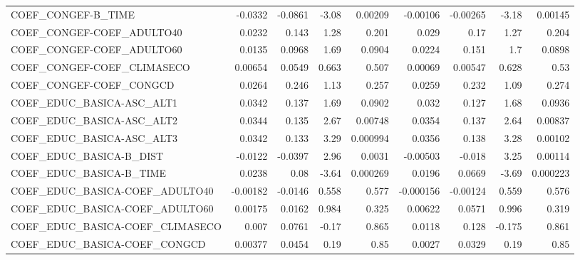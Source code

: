 \begin{tabular}{lrrrrrrrr}
COEF\_CONGEF-B\_TIME                &     -0.0332 &      -0.0861 &   -3.08 &  0.00209 &   -0.00106 &    -0.00265 &        -3.18 &       0.00145 \\
COEF\_CONGEF-COEF\_ADULTO40         &      0.0232 &        0.143 &    1.28 &    0.201 &      0.029 &        0.17 &         1.27 &         0.204 \\
COEF\_CONGEF-COEF\_ADULTO60         &      0.0135 &       0.0968 &    1.69 &   0.0904 &     0.0224 &       0.151 &          1.7 &        0.0898 \\
COEF\_CONGEF-COEF\_CLIMASECO        &     0.00654 &       0.0549 &   0.663 &    0.507 &    0.00069 &     0.00547 &        0.628 &          0.53 \\
COEF\_CONGEF-COEF\_CONGCD           &      0.0264 &        0.246 &    1.13 &    0.257 &     0.0259 &       0.232 &         1.09 &         0.274 \\
COEF\_EDUC\_BASICA-ASC\_ALT1         &      0.0342 &        0.137 &    1.69 &   0.0902 &      0.032 &       0.127 &         1.68 &        0.0936 \\
COEF\_EDUC\_BASICA-ASC\_ALT2         &      0.0344 &        0.135 &    2.67 &  0.00748 &     0.0354 &       0.137 &         2.64 &       0.00837 \\
COEF\_EDUC\_BASICA-ASC\_ALT3         &      0.0342 &        0.133 &    3.29 & 0.000994 &     0.0356 &       0.138 &         3.28 &       0.00102 \\
COEF\_EDUC\_BASICA-B\_DIST           &     -0.0122 &      -0.0397 &    2.96 &   0.0031 &   -0.00503 &      -0.018 &         3.25 &       0.00114 \\
COEF\_EDUC\_BASICA-B\_TIME           &      0.0238 &         0.08 &   -3.64 & 0.000269 &     0.0196 &      0.0669 &        -3.69 &      0.000223 \\
COEF\_EDUC\_BASICA-COEF\_ADULTO40    &    -0.00182 &      -0.0146 &   0.558 &    0.577 &  -0.000156 &    -0.00124 &        0.559 &         0.576 \\
COEF\_EDUC\_BASICA-COEF\_ADULTO60    &     0.00175 &       0.0162 &   0.984 &    0.325 &    0.00622 &      0.0571 &        0.996 &         0.319 \\
COEF\_EDUC\_BASICA-COEF\_CLIMASECO   &       0.007 &       0.0761 &   -0.17 &    0.865 &     0.0118 &       0.128 &       -0.175 &         0.861 \\
COEF\_EDUC\_BASICA-COEF\_CONGCD      &     0.00377 &       0.0454 &    0.19 &     0.85 &     0.0027 &      0.0329 &         0.19 &          0.85 \\

\end{tabular}
